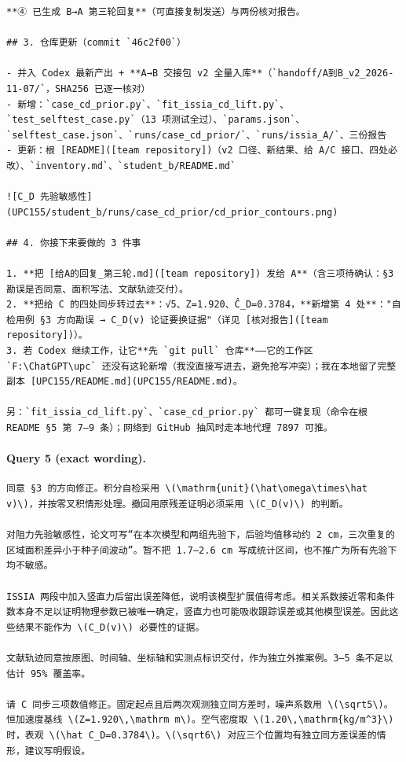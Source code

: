 \documentclass[UTF8,10pt]{ctexart}
\begin{document}
\begin{Verbatim}[breaklines=true,breakanywhere=true,fontsize=\scriptsize,frame=single,framesep=2pt]
**④ 已生成 B→A 第三轮回复**（可直接复制发送）与两份核对报告。

## 3. 仓库更新（commit `46c2f00`）

- 并入 Codex 最新产出 + **A→B 交接包 v2 全量入库**（`handoff/A到B_v2_2026-11-07/`，SHA256 已逐一核对）
- 新增：`case_cd_prior.py`、`fit_issia_cd_lift.py`、`test_selftest_case.py`（13 项测试全过）、`params.json`、`selftest_case.json`、`runs/case_cd_prior/`、`runs/issia_A/`、三份报告
- 更新：根 [README]([team repository])（v2 口径、新结果、给 A/C 接口、四处必改）、`inventory.md`、`student_b/README.md`

![C_D 先验敏感性](UPC155/student_b/runs/case_cd_prior/cd_prior_contours.png)

## 4. 你接下来要做的 3 件事

1. **把 [给A的回复_第三轮.md]([team repository]) 发给 A**（含三项待确认：§3 勘误是否同意、面积写法、文献轨迹交付）。
2. **把给 C 的四处同步转过去**：√5、Z=1.920、Ĉ_D=0.3784，**新增第 4 处**："自检用例 §3 方向勘误 → C_D(v) 论证要换证据"（详见 [核对报告]([team repository])）。
3. 若 Codex 继续工作，让它**先 `git pull` 仓库**——它的工作区 `F:\ChatGPT\upc` 还没有这轮新增（我没直接写进去，避免抢写冲突）；我在本地留了完整副本 [UPC155/README.md](UPC155/README.md)。

另：`fit_issia_cd_lift.py`、`case_cd_prior.py` 都可一键复现（命令在根 README §5 第 7–9 条）；网络到 GitHub 抽风时走本地代理 7897 可推。
\end{Verbatim}

\paragraph{Query 5 (exact wording).}
\begin{Verbatim}[breaklines=true,breakanywhere=true,fontsize=\scriptsize,frame=single,framesep=2pt]
同意 §3 的方向修正。积分自检采用 \(\mathrm{unit}(\hat\omega\times\hat v)\)，并按零叉积情形处理。撤回用原残差证明必须采用 \(C_D(v)\) 的判断。

对阻力先验敏感性，论文可写“在本次模型和两组先验下，后验均值移动约 2 cm，三次重复的区域面积差异小于种子间波动”。暂不把 1.7–2.6 cm 写成统计区间，也不推广为所有先验下均不敏感。

ISSIA 两段中加入竖直力后留出误差降低，说明该模型扩展值得考虑。相关系数接近零和条件数本身不足以证明物理参数已被唯一确定，竖直力也可能吸收跟踪误差或其他模型误差。因此这些结果不能作为 \(C_D(v)\) 必要性的证据。

文献轨迹同意按原图、时间轴、坐标轴和实测点标识交付，作为独立外推案例。3–5 条不足以估计 95% 覆盖率。

请 C 同步三项数值修正。固定起点且后两次观测独立同方差时，噪声系数用 \(\sqrt5\)。恒加速度基线 \(Z=1.920\,\mathrm m\)。空气密度取 \(1.20\,\mathrm{kg/m^3}\) 时，表观 \(\hat C_D=0.3784\)。\(\sqrt6\) 对应三个位置均有独立同方差误差的情形，建议写明假设。
\end{Verbatim}
\end{document}
